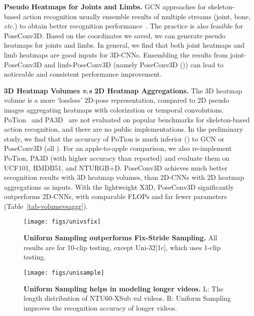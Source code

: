 \noindent
\textbf{Pseudo Heatmaps for Joints and Limbs. }
GCN approaches for skeleton-based action recognition usually ensemble results of multiple streams (joint, bone, \textit{etc.}) 
to obtain better recognition performance~\cite{shi2019two}. 
The practice is also feasible for PoseConv3D.
Based on the coordinates  we saved, 
we can generate pseudo heatmaps for joints and limbs. 
In general, we find that both joint heatmaps and limb heatmaps are good inputs for 3D-CNNs. 
Ensembling the results from joint-PoseConv3D and limb-PoseConv3D (namely PoseConv3D ()) can lead to noticeable and consistent performance improvement.

\noindent
\textbf{3D Heatmap Volumes \emph{v.s} 2D Heatmap Aggregations. }
The 3D heatmap volume is a more `lossless' 2D-pose representation,
compared to 2D pseudo images aggregating heatmaps
with colorization or temporal convolutions.
PoTion~\cite{choutas2018potion} and PA3D~\cite{yan2019pa3d} are not evaluated on popular benchmarks for skeleton-based action recognition, 
and there are no public implementations.  
In the preliminary study, we find that the accuracy of PoTion is much inferior () to GCN or PoseConv3D (all ).
For an apple-to-apple comparison, we also re-implement PoTion, PA3D 
(with higher accuracy than reported) 
and evaluate them on UCF101, HMDB51, and NTURGB+D. 
PoseConv3D achieves much better recognition results with 3D heatmap volumes, 
than 2D-CNNs with 2D heatmap aggregations as inputs. 
With the lightweight X3D, PoseConv3D significantly outperforms 2D-CNNs, 
with comparable FLOPs and far fewer parameters (Table~\ref{tab-volumevsaggr}).

\begin{figure}[t]
	\captionsetup{font=small}
	\texttt{[image: figs/univsfix]} 
	\vspace{-8mm}
	\caption{ \textbf{Uniform Sampling outperforms Fix-Stride Sampling. } All results are for 10-clip testing, except Uni-32[1c], which uses 1-clip testing. }
	\label{fig-unisample}
	\vspace{-3mm}
\end{figure}

\begin{figure}[t]
	\captionsetup{font=small}
	\centering
	\texttt{[image: figs/unisample]} 
	\vspace{-5mm}
	\caption{ \textbf{Uniform Sampling helps in modeling longer videos. }  
		L: The length distribution of NTU60-XSub val videos.
		R: Uniform Sampling improves the recognition accuracy of longer videos.}
	\label{fig-unideeper}
	\vspace{-3mm}
\end{figure}

